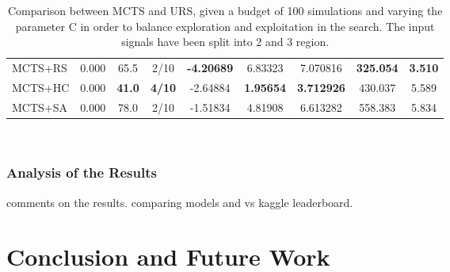 \documentclass[12pt]{article}
\begin{document}
\begin{table}[ht]
\begin{tabular}{|l|l|c|c|c|c|c|c|c|}
MCTS+RS                                     & 0.000              &  65.5                   & 2/10                          & \textbf{-4.20689}  & 6.83323  & 7.070816 & \textbf{325.054} &  \textbf{3.510}    \\
MCTS+HC                                     & 0.000              &  \textbf{41.0}          & \textbf{4/10}                          & -2.64884  & \textbf{1.95654}  & \textbf{3.712926} &  430.037 &  5.589    \\
MCTS+SA                                     & 0.000              &  78.0                   & 2/10                          & -1.51834  & 4.81908  & 6.613282 &  558.383 &  5.834    \\ \hline
\end{tabular}
\caption{Comparison between MCTS and URS, given a budget of 100 simulations and varying the parameter C in order to balance exploration and exploitation in the search. The input signals have been split into 2 and 3 region.}~\label{table:res:s1}
\end{table}


\pagebreak

\subsubsection{Analysis of the Results}
comments on the results. comparing models and vs kaggle leaderboard.


\section{Conclusion and Future Work}





\end{document}
